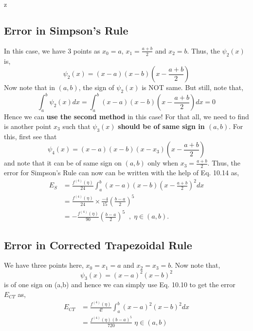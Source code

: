 z\documentclass[a4paper,12pt,twoside]{book}
\newcommand{\nll}[0]{\newline\newline}
\begin{document}
\subsection{Error in Simpson's Rule}
In this case, we have 3 points as $x_0 = a$, $x_1 = \frac{a+b}{2}$ and $x_2 = b$. Thus, the $\psi_2(x)$ is,
\[\psi_2(x) = (x-a)(x-b)\left( x-\frac{a+b}{2} \right)\]
Now note that in $(a,b)$, the sign of $\psi_2(x)$ is NOT same. But still, note that,
\[\int_a^b \psi_2(x)dx = \int_a^b (x-a)(x-b)\left( x-\frac{a+b}{2} \right) dx = 0\]
Hence we can \textbf{use the second method} in this case! For that all, we need to find is another point $x_3$ such that $\psi_3(x)$ \textbf{should be of same sign in $(a,b)$}. 
\nll
For this, first see that
\[\psi_4(x) = (x-a)(x-b)(x-x_3)\left(x-\frac{a+b}{2}\right)\]
and note that it can be of same sign on $(a,b)$ only when $x_3 = \frac{a+b}{2}$. Thus, the error for Simpson's Rule can now can be written with the help of Eq. 10.14 as,
\begin{equation}
    \begin{split}
        E_S &= \frac{f^{(4)}(\eta)}{24} \int_a^b (x-a)(x-b)\left(x-\frac{a+b}{2}\right)^2dx\\
        &= \frac{f^{(4)}(\eta)}{24}\times \frac{-4}{15}\left( \frac{b-a}{2} \right)^5\\
        &\boxed{= -\frac{f^{(4)}(\eta)}{90}\left( \frac{b-a}{2} \right)^5\;\;,\;\eta \in (a,b)}.
    \end{split}
\end{equation}
\subsection{Error in Corrected Trapezoidal Rule}
We have three points here, $x_0 = x_1 = a$ and $x_2 = x_3 = b$. Now note that,
\[ \psi_3(x) = (x-a)^2(x-b)^2 \]
is of one sign on (a,b) and hence we can simply use Eq. 10.10 to get the error $E_{CT}$ as,
\begin{equation}
\begin{split}
    E_{CT} &= \frac{{f^{(4)} (\eta)}}{4!} \int_a^b (x-a)^2(x-b)^2 dx\\
    &= \boxed{\frac{f^{(4)}(\eta) (b-a)^5}{720}\;\eta \in (a,b)}
    \end{split}
\end{equation}
\end{document}
